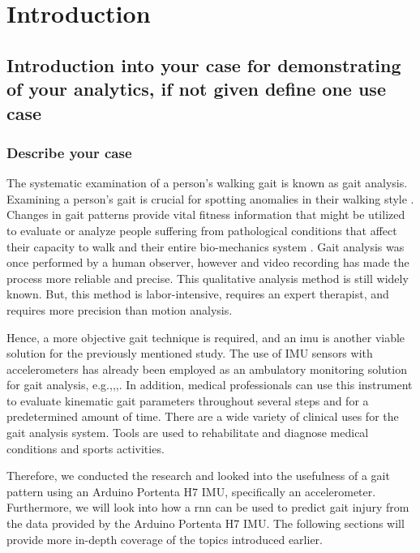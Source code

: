 %
%

\chapter{Introduction}

\section{Introduction into your case for demonstrating of your analytics, if not given define one use case}

\subsection{Describe your case}

The systematic examination of a person's walking gait is known as gait analysis. Examining a person's gait is crucial for spotting anomalies in their walking style \cite{Hannink2016}. Changes in gait patterns provide vital fitness information that might be utilized to evaluate or analyze people suffering from pathological conditions that affect their capacity to walk and their entire bio-mechanics system \cite{Ahmadi2016}. Gait analysis was once performed by a human observer, however and video recording has made the process more reliable and precise. This qualitative analysis method is still widely known. But, this method is labor-intensive, requires an expert therapist, and requires more precision than motion analysis.

\bigskip

Hence, a more objective gait technique is required, and an \ac{imu} is another viable solution for the previously mentioned study. The use of IMU sensors with accelerometers has already been employed as an ambulatory monitoring solution for gait analysis, e.g.,\cite{Godfrey2008},\cite{Selles2005},\cite{Sabatini2005}. In addition, medical professionals can use this instrument to evaluate kinematic gait parameters throughout several steps and for a predetermined amount of time. There are a wide variety of clinical uses for the gait analysis system. Tools are used to rehabilitate and diagnose medical conditions and sports activities. 

\bigskip

Therefore, we conducted the research and looked into the usefulness of a gait pattern using an Arduino Portenta H7 IMU, specifically an accelerometer. Furthermore, we will look into how a \ac{rnn} can be used to predict gait injury from the data provided by the Arduino Portenta H7 IMU. The following sections will provide more in-depth coverage of the topics introduced earlier.

